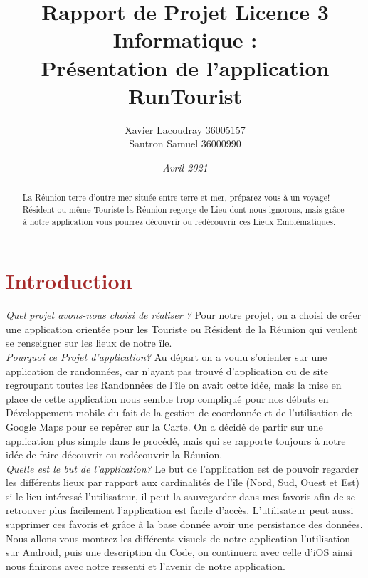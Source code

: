 \documentclass{article}
\title{\textbf {\color{red} {Rapport de Projet Licence 3 Informatique :\\Présentation de l'application RunTourist}}}
\author{ {\color{cyan} Xavier Lacoudray 36005157 \\ \color{cyan} Sautron Samuel 36000990}}
\date{\itshape Avril 2021}
\begin{document}
\maketitle
\begin{abstract}

La Réunion terre d’outre-mer située entre terre et mer, préparez-vous à un voyage!
\newline
Résident ou même Touriste la Réunion regorge de Lieu dont nous ignorons, mais grâce à notre application vous pourrez découvrir ou redécouvrir ces Lieux Emblématiques. 
\end{abstract}

\section{\textcolor{brown}{Introduction }}
\label{section:intro}
{\color{magenta}\em{Quel projet avons-nous choisi de réaliser ?}}
\newline
\color{blue}Pour notre projet, on a choisi de créer une application orientée pour les Touriste ou Résident de la Réunion qui veulent se renseigner sur les lieux de notre île.
\newline \\
{\em\color{magenta}Pourquoi ce Projet d'application?}
\newline
\color{blue} Au départ on a voulu s’orienter sur une application de randonnées, car n’ayant pas trouvé d'application ou de site regroupant toutes les Randonnées de l'île on avait cette idée, mais la mise en place de cette application nous semble trop compliqué pour nos débuts en Développement mobile du fait de la gestion de coordonnée et de l'utilisation de Google Maps pour se repérer sur la Carte. On a décidé de partir sur une application plus simple dans le procédé, mais qui se rapporte toujours à notre idée de faire découvrir ou redécouvrir la Réunion.
\newline \\
{\em\color{magenta}Quelle est le but de l'application?}
\newline
\color{blue} Le but de l’application est de pouvoir regarder les différents lieux par rapport aux cardinalités de l’île (Nord, Sud, Ouest et Est) si le lieu intéressé l’utilisateur, il peut la sauvegarder dans mes favoris afin de se retrouver plus facilement l’application est facile d’accès.
L’utilisateur peut aussi supprimer ces favoris et grâce à la base donnée avoir une persistance des données.
\newline\\
Nous allons vous montrez les différents visuels de notre application l’utilisation sur Android, puis une description du Code, on continuera avec celle d’iOS ainsi nous finirons avec notre ressenti et l’avenir de notre application.
\end{document}
